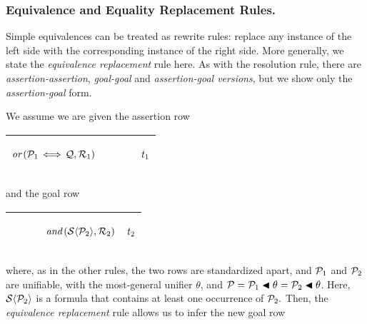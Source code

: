 \documentclass[runningheads]{llncs}
\DeclareMathOperator{\uand}{\emph{and}\,}
\DeclareMathOperator{\uor}{\emph{or}\,}
\DeclareMathOperator{\unot}{\emph{not}\kern-.0pt}
\DeclareMathOperator{\uiff}{\iff}
\begin{document}
   

\subsubsection{Equivalence and Equality Replacement Rules.}  Simple equivalences can be treated as rewrite rules:  replace any instance of the left side with the corresponding instance of the right side.  More generally, we state the \emph{equivalence replacement} rule here.  As with the resolution rule, there are \emph{assertion-assertion}, \emph{goal-goal} and \emph{assertion-goal versions}, but we show only the \emph{assertion-goal} form.

We assume we are given the assertion row
   \begin{center}
\begin{tabular} {T}
\hline
    \begin{center}$\uor(\expsub{\mathcal{P}}{1}\uiff \mathcal{Q},\expsub{\mathcal{R}}{1})$ \end{center}& $\qquad$ & \begin{center}${t}_{1}$\end{center} \\
  \hline
\end{tabular}
\end{center}
\noindent and the goal row
  \begin{center}
\begin{tabular} {T}
\hline
   $\qquad$ &  \begin{center}$ \uand (\mathcal{S}\langle\expsub{\mathcal{P}}{2}\rangle,\expsub{\mathcal{R}}{2})$\end{center}   & \begin{center} ${t}_{2}$\end{center} \\
  \hline
\end{tabular}
\end{center}

 
\noindent where, as in the other rules, the two rows are standardized apart, and ${\mathcal{P}}_{1}$ and ${\mathcal{P}}_{2}$ are unifiable, with the most-general unifier $\theta$, and $\mathcal{P} = {\mathcal{P}}_{1} \blacktriangleleft \theta = {\mathcal{P}}_{2} \blacktriangleleft \theta$.  Here, $\mathcal{S}\langle{\mathcal{P}}_{2}\rangle$ is a formula that contains at least one occurrence of ${\mathcal{P}}_{2}.$
Then, the \emph{equivalence replacement} rule allows us to infer the new goal row
\end{document}
